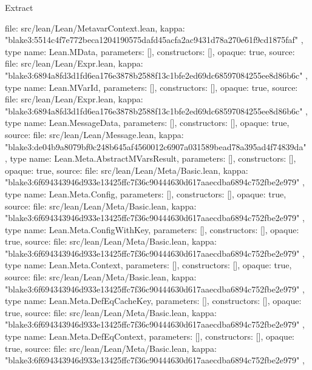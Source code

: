 \begin{lexlean}{Extract}
\begin{toolingmodule}
{{{        file: src/lean/Lean/MetavarContext.lean,
        kappa: "blake3:5514c4f7e772beca1204190575dafd45acfa2ac9431d78a270e61f9cd1875faf"
      }
    },
    type{
      name: Lean.MData,
      parameters: [],
      constructors: [],
      opaque: true,
      source: {
        file: src/lean/Lean/Expr.lean,
        kappa: "blake3:6894a8fd3d1fd6ea176e3878b2588f13c1bfe2ed69dc68597084255ee8d86b6c"
      }
    },
    type{
      name: Lean.MVarId,
      parameters: [],
      constructors: [],
      opaque: true,
      source: {
        file: src/lean/Lean/Expr.lean,
        kappa: "blake3:6894a8fd3d1fd6ea176e3878b2588f13c1bfe2ed69dc68597084255ee8d86b6c"
      }
    },
    type{
      name: Lean.MessageData,
      parameters: [],
      constructors: [],
      opaque: true,
      source: {
        file: src/lean/Lean/Message.lean,
        kappa: "blake3:de04b9a8079bf0c248b645af4560012c6907a031589bead78a395ad4f74839da"
      }
    },
    type{
      name: Lean.Meta.AbstractMVarsResult,
      parameters: [],
      constructors: [],
      opaque: true,
      source: {
        file: src/lean/Lean/Meta/Basic.lean,
        kappa: "blake3:6f694343946d933e13425ffc7f36c90444630d617aaecdba6894c752fbe2e979"
      }
    },
    type{
      name: Lean.Meta.Config,
      parameters: [],
      constructors: [],
      opaque: true,
      source: {
        file: src/lean/Lean/Meta/Basic.lean,
        kappa: "blake3:6f694343946d933e13425ffc7f36c90444630d617aaecdba6894c752fbe2e979"
      }
    },
    type{
      name: Lean.Meta.ConfigWithKey,
      parameters: [],
      constructors: [],
      opaque: true,
      source: {
        file: src/lean/Lean/Meta/Basic.lean,
        kappa: "blake3:6f694343946d933e13425ffc7f36c90444630d617aaecdba6894c752fbe2e979"
      }
    },
    type{
      name: Lean.Meta.Context,
      parameters: [],
      constructors: [],
      opaque: true,
      source: {
        file: src/lean/Lean/Meta/Basic.lean,
        kappa: "blake3:6f694343946d933e13425ffc7f36c90444630d617aaecdba6894c752fbe2e979"
      }
    },
    type{
      name: Lean.Meta.DefEqCacheKey,
      parameters: [],
      constructors: [],
      opaque: true,
      source: {
        file: src/lean/Lean/Meta/Basic.lean,
        kappa: "blake3:6f694343946d933e13425ffc7f36c90444630d617aaecdba6894c752fbe2e979"
      }
    },
    type{
      name: Lean.Meta.DefEqContext,
      parameters: [],
      constructors: [],
      opaque: true,
      source: {
        file: src/lean/Lean/Meta/Basic.lean,
        kappa: "blake3:6f694343946d933e13425ffc7f36c90444630d617aaecdba6894c752fbe2e979"
      }
    },
}
\end{toolingmodule}
\end{lexlean}
